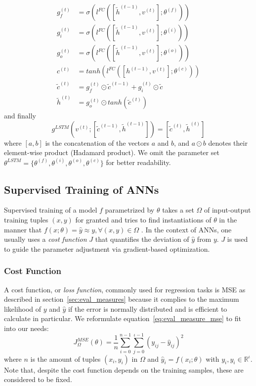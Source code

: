 \begin{equation} \label{eq:lstm_interm}
\begin{split}
g_f^{(t)} & = \sigma(l^{FC}([\tilde{h}^{(t-1)}, v^{(t)}]; \theta^{(f)})) \\
g_i^{(t)} & = \sigma(l^{FC}([\tilde{h}^{(t-1)}, v^{(t)}]; \theta^{(i)})) \\
g_o^{(t)} & = \sigma(l^{FC}([\tilde{h}^{(t-1)}, v^{(t)}]; \theta^{(o)})) \\
c^{(t)} & = tanh(l^{FC}([h^{(t-1)}, v^{(t)}]; \theta^{(c)})) \\
\tilde{c}^{(t)} & = g_f^{(t)} \odot \tilde{c}^{(t-1)} + g_i^{(t)} \odot \tilde{c} \\
\tilde{h}^{(t)} & = g_o^{(t)} \odot tanh(\tilde{c}^{(t)})
\end{split}
\end{equation}
and finally
\begin{equation} \label{eq:lstm}
g^{LSTM}(v^{(t)};[\tilde{c}^{(t-1)}, \tilde{h}^{(t-1)}]) = [\tilde{c}^{(t)}, \tilde{h}^{(t)}]
\end{equation}
where $[a, b]$ is the concatenation of the vectors $a$ and $b$, and $a \odot b$ denotes their element-wise  product (Hadamard product). We omit the parameter set $\theta^{LSTM} = \{\theta^{(f)}, \theta^{(i)}, \theta^{(o)}, \theta^{(c)}\}$ for better readability.

\subsection{Supervised Training of ANNs}
Supervised training of a model $f$ parametrized by $\theta$ takes a set $\Omega$ of input-output training tuples $(x,y)$ for granted and tries to find instantiations of $\theta$ in the manner that $f(x;\theta) = \hat{y} \approx y, \forall (x,y) \in \Omega$ \autocite{mohri_foundations_2012}. In the context of \ac{ANN}s, one usually uses a \textit{cost function} $J$ that quantifies the deviation of $\hat{y}$ from $y$. $J$ is used to guide the parameter adjustment via gradient-based optimization. 

\subsubsection{Cost Function}
\label{subsec:cost_function}
A cost function, or \textit{loss function}, commonly used for regression tasks is \acf{MSE} as described in section~\ref{sec:eval_measures} because it complies to the maximum likelihood of $y$ and $\hat{y}$  if the error is normally distributed and is efficient to calculate in particular. We reformulate equation~\eqref{eq:eval_measure_mse} to fit into our needs:
\begin{equation}
J^{MSE}_\Omega(\theta) = \frac{1}{n}\sum_{i=0}^{n-1}\sum_{j=0}^{\iota-1}(y_{ij}-\hat{y}_{ij})^2 \label{eq:j_mse}
\end{equation}
where $n$ is the amount of tuples $(x_i, y_i)$ in $\Omega$ and $\hat{y}_i = f(x_i;\theta)$ with $y_i, \hat{y_i} \in \mathbb{R}^\iota$. Note that, despite the cost function depends on the training samples, these are considered to be fixed. 

